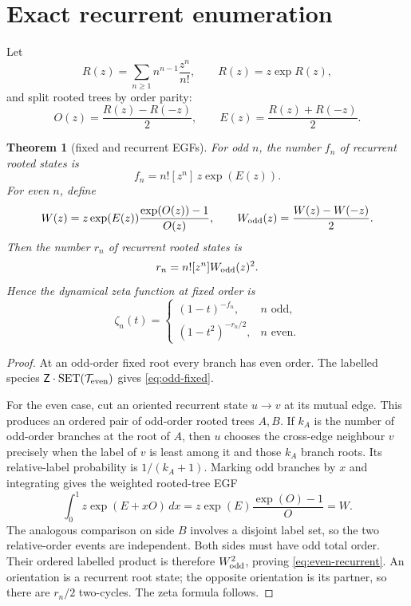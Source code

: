 \documentclass[a4paper,10pt]{amsart}
\newtheorem{theorem}{Theorem}[section]
\theoremstyle{remark}
\newcommand{\Tcal}{\mathcal T}
\begin{document}
\section{Exact recurrent enumeration}

Let
\begin{equation}\label{eq:tree-egf}
 R(z)=\sum_{n\ge1}n^{n-1}\frac{z^n}{n!},\qquad R(z)=z\exp R(z),
\end{equation}
and split rooted trees by order parity:
\begin{equation}\label{eq:EO}
 O(z)=\frac{R(z)-R(-z)}2,\qquad E(z)=\frac{R(z)+R(-z)}2.
\end{equation}

\begin{theorem}[fixed and recurrent EGFs]\label{thm:egf}
For odd $n$, the number $f_n$ of recurrent rooted states is
\begin{equation}\label{eq:odd-fixed}
 f_n=n![z^n]\,z\exp(E(z)).
\end{equation}
For even $n$, define
\begin{equation}\label{eq:W}
 W(z)=z\exp(E(z))\frac{\exp(O(z))-1}{O(z)},\qquad
 W_{\rm odd}(z)=\frac{W(z)-W(-z)}2.
\end{equation}
Then the number $r_n$ of recurrent rooted states is
\begin{equation}\label{eq:even-recurrent}
 r_n=n![z^n]W_{\rm odd}(z)^2.
\end{equation}
Hence the dynamical zeta function at fixed order is
\begin{equation}\label{eq:zeta}
 \zeta_n(t)=\begin{cases}
 (1-t)^{-f_n},&n\text{ odd},\\
 (1-t^2)^{-r_n/2},&n\text{ even}.
 \end{cases}
\end{equation}
\end{theorem}

\begin{proof}
At an odd-order fixed root every branch has even order.  The labelled species
$\mathsf Z\cdot\operatorname{SET}(\Tcal_{\rm even})$ gives
\eqref{eq:odd-fixed}.

For the even case, cut an oriented recurrent state $u\to v$ at its mutual
edge.  This produces an ordered pair of odd-order rooted trees $A,B$.  If
$k_A$ is the number of odd-order branches at the root of $A$, then $u$ chooses
the cross-edge neighbour $v$ precisely when the label of $v$ is least among
it and those $k_A$ branch roots.  Its relative-label probability is
$1/(k_A+1)$.  Marking odd branches by $x$ and integrating gives the weighted
rooted-tree EGF
\begin{equation*}
 \int_0^1z\exp(E+xO)\,dx
 =z\exp(E)\frac{\exp(O)-1}{O}=W.
\end{equation*}
The analogous comparison on side $B$ involves a disjoint label set, so the
two relative-order events are independent.  Both sides must have odd total
order.  Their ordered labelled product is therefore $W_{\rm odd}^2$, proving
\eqref{eq:even-recurrent}.  An orientation is a recurrent root state; the
opposite orientation is its partner, so there are $r_n/2$ two-cycles.  The
zeta formula follows.
\end{proof}
\end{document}
